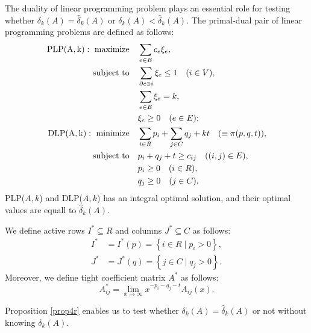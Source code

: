 The duality of linear programming problem plays an essential role 
for testing whether $ \delta_k (A) = \hat{\delta}_k (A) $ or $ \delta_k (A) < \hat{\delta}_k (A)$. 
The primal-dual pair of linear programming problems are defined as follows:
\begin{align}
\mathrm{PLP(A,k): \  maximize} \quad  & \sum_{e \in E} c_e \xi_e, \notag \\
\mathrm{subject \  to}      \quad     & \sum_{ \partial e \ni i } \xi_e \le 1 \quad ( i \in V ), \label{defplp} \\
                                      & \sum_{ e \in E } \xi_e = k, \notag \\
                                      & \xi_e \ge 0 \quad ( e \in E ); \notag \\
\mathrm{DLP(A,k): \  minimize} \quad  & \sum_{i \in R} p_i + \sum_{j \in C} q_j + k t \quad ( \equiv \pi (p,q,t) ), \notag \\
\mathrm{subject \  to} \quad   & p_i + q_j + t \ge c_{ij} \quad ((i,j) \in E), \label{defdlp} \\
                               & p_i \ge 0 \quad ( i \in R ), \notag\\
                               & q_j \ge 0 \quad ( j \in C ). \notag
\end{align}
PLP($A,k$) and DLP($A,k$) has an integral optimal solution, 
and their optimal values are equall to $ \hat{\delta}_k (A) $.

We define active rows $ I^{\ast} \subseteq R $ and columns $ J^{\ast} \subseteq C $ as follows:
\begin{align}
I^{\ast} &= I^{\ast} (p) = \left\{ i \in R \mid p_i > 0 \right\}, \label{eqdefar}\\
J^{\ast} &= J^{\ast} (q) = \left\{ j \in C \mid q_j > 0 \right\}. \label{eqdefac}
\end{align}
Moreover, we define tight coefficient matrix $ A^{\ast} $ as follows:
\begin{equation}
A^{\ast}_{ij} = \lim_{ x \to \infty } x^{ -p_i - q_j - t } A_{ij} (x). \label{eqdefaa}
\end{equation}

Proposition \ref{prop4r} enables us to test whether $ \delta_k (A) = \hat{ \delta}_k (A) $ or not 
without knowing $ \delta_k (A) $.

